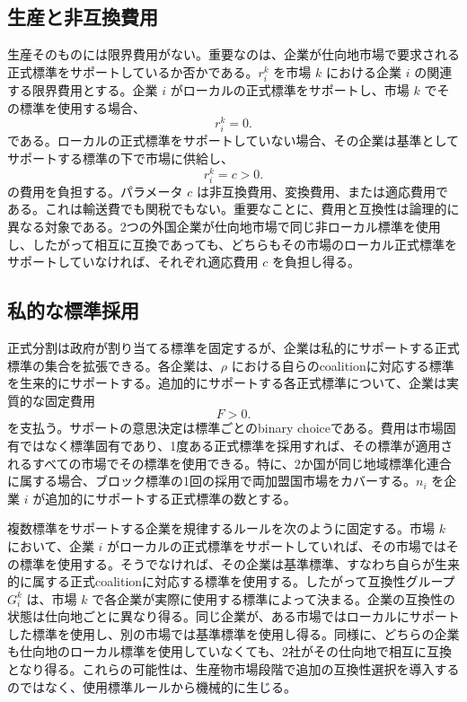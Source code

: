 \subsection{生産と非互換費用}
\label{subsec:model-costs}

生産そのものには限界費用がない。重要なのは、企業が仕向地市場で要求される正式標準をサポートしているか否かである。$r_i^k$ を市場 $k$ における企業 $i$ の関連する限界費用とする。企業 $i$ がローカルの正式標準をサポートし、市場 $k$ でその標準を使用する場合、
\begin{equation}
    r_i^k=0.
    \label{eq:marginal-cost-compatible}
\end{equation}
である。ローカルの正式標準をサポートしていない場合、その企業は基準としてサポートする標準の下で市場に供給し、
\begin{equation}
    r_i^k=c>0.
    \label{eq:marginal-cost-incompatible}
\end{equation}
の費用を負担する。パラメータ $c$ は非互換費用、変換費用、または適応費用である。これは輸送費でも関税でもない。重要なことに、費用と互換性は論理的に異なる対象である。2つの外国企業が仕向地市場で同じ非ローカル標準を使用し、したがって相互に互換であっても、どちらもその市場のローカル正式標準をサポートしていなければ、それぞれ適応費用 $c$ を負担し得る。

\subsection{私的な標準採用}
\label{subsec:model-private-adoption}

正式分割は政府が割り当てる標準を固定するが、企業は私的にサポートする正式標準の集合を拡張できる。各企業は、$\rho$ における自らのcoalitionに対応する標準を生来的にサポートする。追加的にサポートする各正式標準について、企業は実質的な固定費用
\begin{equation}
    F>0.
    \label{eq:private-adoption-cost}
\end{equation}
を支払う。サポートの意思決定は標準ごとのbinary choiceである。費用は市場固有ではなく標準固有であり、1度ある正式標準を採用すれば、その標準が適用されるすべての市場でその標準を使用できる。特に、2か国が同じ地域標準化連合に属する場合、ブロック標準の1回の採用で両加盟国市場をカバーする。$n_i$ を企業 $i$ が追加的にサポートする正式標準の数とする。

複数標準をサポートする企業を規律するルールを次のように固定する。市場 $k$ において、企業 $i$ がローカルの正式標準をサポートしていれば、その市場ではその標準を使用する。そうでなければ、その企業は基準標準、すなわち自らが生来的に属する正式coalitionに対応する標準を使用する。したがって互換性グループ $G_i^k$ は、市場 $k$ で各企業が実際に使用する標準によって決まる。企業の互換性の状態は仕向地ごとに異なり得る。同じ企業が、ある市場ではローカルにサポートした標準を使用し、別の市場では基準標準を使用し得る。同様に、どちらの企業も仕向地のローカル標準を使用していなくても、2社がその仕向地で相互に互換となり得る。これらの可能性は、生産物市場段階で追加の互換性選択を導入するのではなく、使用標準ルールから機械的に生じる。

